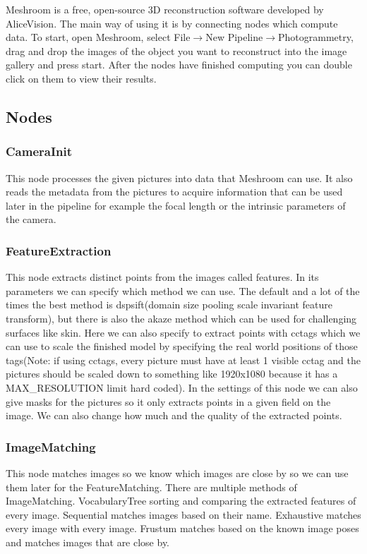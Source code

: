 Meshroom is a free, open-source 3D reconstruction software developed by AliceVision. The main way of using it is by connecting nodes which compute data. To start, open Meshroom, select File$\rightarrow$New Pipeline$\rightarrow$Photogrammetry, drag and drop the images of the object you want to reconstruct into the image gallery and press start. After the nodes have finished computing you can double click on them to view their results. 

\subsection{Nodes}

\subsubsection{CameraInit}
    This node processes the given pictures into data that Meshroom can use. It also reads the metadata from the pictures to acquire information that can be used later in the pipeline for example the focal length or the intrinsic parameters of the camera.


\subsubsection{FeatureExtraction}
    This node extracts distinct points from the images called features. In its parameters we can specify which method we can use. The default and a lot of the times the best method is dspsift(domain size pooling scale invariant feature transform), but there is also the akaze method which can be used for challenging surfaces like skin. Here we can also specify to extract points with cctags which we can use to scale the finished model by specifying the real world positions of those tags(Note: if using cctags, every picture must have at least 1 visible cctag and the pictures should be scaled down to something like 1920x1080 because it has a MAX\_RESOLUTION limit hard coded).
    In the settings of this node we can also give masks for the pictures so it only extracts points in a given field on the image. We can also change how much and the quality of the extracted points.
    
\subsubsection{ImageMatching}
    This node matches images so we know which images are close by so we can use them later for the FeatureMatching. There are multiple methods of ImageMatching. VocabularyTree sorting and comparing the extracted features of every image. Sequential matches images based on their name. Exhaustive matches every image with every image. Frustum matches based on the known image poses and matches images that are close by. 

